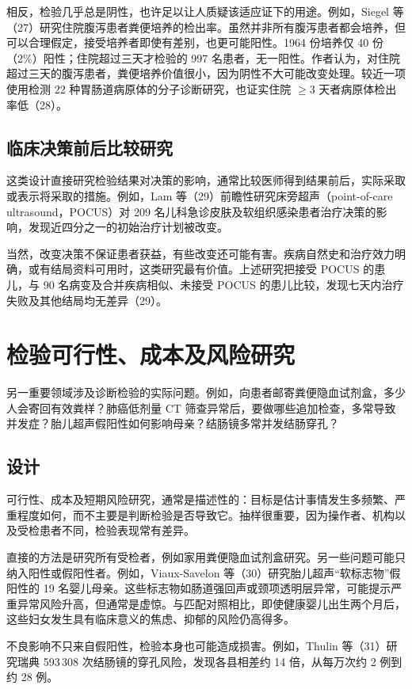 相反，检验几乎总是阴性，也许足以让人质疑该适应证下的用途。例如，Siegel 等（27）研究住院腹泻患者粪便培养的检出率。虽然并非所有腹泻患者都会培养，但可以合理假定，接受培养者即使有差别，也更可能阳性。1964 份培养仅 40 份（2\%）阳性；住院超过三天才检验的 997 名患者，无一阳性。作者认为，对住院超过三天的腹泻患者，粪便培养价值很小，因为阴性不大可能改变处理。较近一项使用检测 22 种胃肠道病原体的分子诊断研究，也证实住院 $\geq3$ 天者病原体检出率低（28）。

\subsection{临床决策前后比较研究}
这类设计直接研究检验结果对决策的影响，通常比较医师得到结果前后，实际采取或表示将采取的措施。例如，Lam 等（29）前瞻性研究床旁超声（point-of-care ultrasound，POCUS）对 209 名儿科急诊皮肤及软组织感染患者治疗决策的影响，发现近四分之一的初始治疗计划被改变。

当然，改变决策不保证患者获益，有些改变还可能有害。疾病自然史和治疗效力明确，或有结局资料可用时，这类研究最有价值。上述研究把接受 POCUS 的患儿，与 90 名病变及合并疾病相似、未接受 POCUS 的患儿比较，发现七天内治疗失败及其他结局均无差异（29）。

\section{检验可行性、成本及风险研究}
另一重要领域涉及诊断检验的实际问题。例如，向患者邮寄粪便隐血试剂盒，多少人会寄回有效粪样？肺癌低剂量 CT 筛查异常后，要做哪些追加检查，多常导致并发症？胎儿超声假阳性如何影响母亲？结肠镜多常并发结肠穿孔？

\subsection{设计}
可行性、成本及短期风险研究，通常是描述性的：目标是估计事情发生多频繁、严重程度如何，而不主要是判断检验是否导致它。抽样很重要，因为操作者、机构以及受检患者不同，检验表现常有差异。

直接的方法是研究所有受检者，例如家用粪便隐血试剂盒研究。另一些问题可能只纳入阳性或假阳性者。例如，Viaux-Savelon 等（30）研究胎儿超声“软标志物”假阳性的 19 名婴儿母亲。这些标志物如肠道强回声或颈项透明层异常，可能提示严重异常风险升高，但通常是虚惊。与匹配对照相比，即使健康婴儿出生两个月后，这些妇女发生具有临床意义的焦虑、抑郁的风险仍高得多。

不良影响不只来自假阳性，检验本身也可能造成损害。例如，Thulin 等（31）研究瑞典 593\,308 次结肠镜的穿孔风险，发现各县相差约 14 倍，从每万次约 2 例到约 28 例。

